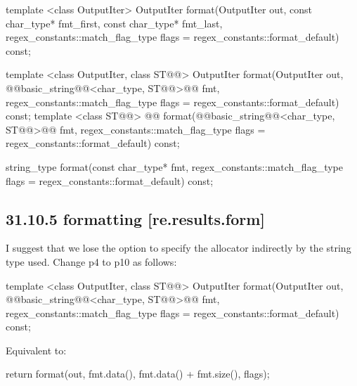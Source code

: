 \documentclass[ebook,11pt,article]{memoir}
\begin{document}
\begin{removedblock}
\begin{codeblock}
     template <class OutputIter>
      OutputIter
      format(OutputIter out,
             const char_type* fmt_first, const char_type* fmt_last,
             regex_constants::match_flag_type flags =
              regex_constants::format_default) const;
\end{codeblock}
\end{removedblock}
\begin{codeblock}
     template <class OutputIter, class ST@@>
       OutputIter
       format(OutputIter out,
              @@basic_string@@<char_type, ST@@>@\removed{\&}@ fmt,
              regex_constants::match_flag_type flags =
                regex_constants::format_default) const;
     template <class ST@@>
      @@
      format(@@basic_string@@<char_type, ST@@>@\removed{\&}@ fmt,
             regex_constants::match_flag_type flags =
               regex_constants::format_default) const;
\end{codeblock}
\begin{removedblock}
\begin{codeblock}               
     string_type
     format(const char_type* fmt,
            regex_constants::match_flag_type flags =
              regex_constants::format_default) const;


\end{codeblock}
\end{removedblock}

\subsection{31.10.5  formatting [re.results.form]}
I suggest that we lose the option to specify the allocator indirectly by the string type used.
Change p4 to p10 as follows:
\begin{itemdecl}
template <class OutputIter, class ST@@>
  OutputIter format(OutputIter out,
              @@basic_string@@<char_type, ST@@>@\removed{\&}@ fmt,
                    regex_constants::match_flag_type flags =
                      regex_constants::format_default) const;
\end{itemdecl}

\begin{itemdescr}
\pnum
\effects Equivalent to:
\begin{codeblock}
return format(out, fmt.data(), fmt.data() + fmt.size(), flags);
\end{codeblock}
\end{itemdescr}
\end{document}
